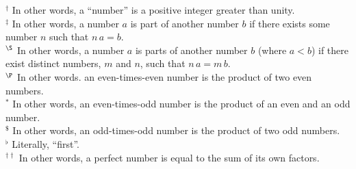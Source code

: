{\footnotesize\noindent$^\dag$ In other words, a
``number'' is a positive integer greater than unity.\\[0.5ex]
$^\ddag$ In other words, a number $a$ is part of
another number $b$ if there exists some number $n$ such
that $n\,a = b$.\\[0.5ex]
$^\S$  In other words, a number $a$ is parts of another number
$b$ (where $a<b$) if there exist distinct numbers, $m$ and $n$, such that $n\,a=m\,b$.\\[0.5ex]
$^\P$ In other words.
an even-times-even number is the product of two even numbers.\\[0.5ex]
$^\ast$ In other words,
an even-times-odd number is the product of an even and an odd number.\\[0.5ex]
$^\$$ In other words,
an odd-times-odd number is the product of two odd numbers.\\[0.5ex]
$^\flat$ Literally, ``first''.\\[0.5ex]
$^{\dag\dag}$  In other words, a perfect number is equal to the sum of its own factors.}

